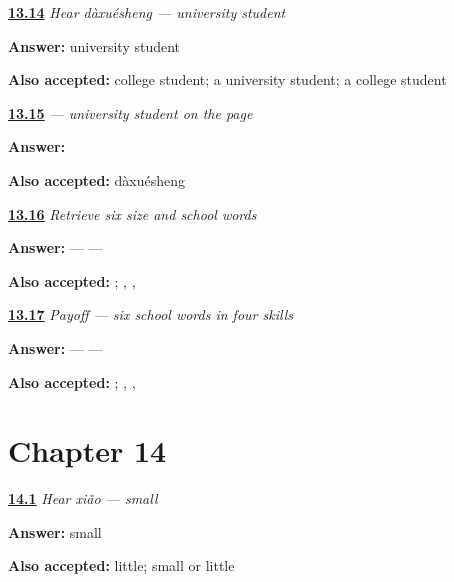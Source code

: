 \noindent\begin{minipage}[t]{\linewidth}
\raggedright
\hyperlink{review-ZH-C13-hear-daxuesheng-meaning}{\textbf{13.14}} \emph{Hear \emph{dàxuésheng} — university student}\par
\small \textbf{Answer:} university student\par
\footnotesize \textbf{Also accepted:} college student; a university student; a college student
\end{minipage}\par\medskip

\noindent\begin{minipage}[t]{\linewidth}
\raggedright
\hyperlink{review-ZH-C13-daxuesheng-write}{\textbf{13.15}} \emph{ — university student on the page}\par
\small \textbf{Answer:} \par
\footnotesize \textbf{Also accepted:}  dàxuésheng
\end{minipage}\par\medskip

\noindent\begin{minipage}[t]{\linewidth}
\raggedright
\hyperlink{review-ZH-R13-school-six-recall}{\textbf{13.16}} \emph{Retrieve six size and school words}\par
\small \textbf{Answer:}  —  — \par
\footnotesize \textbf{Also accepted:}   ; , , 
\end{minipage}\par\medskip

\noindent\begin{minipage}[t]{\linewidth}
\raggedright
\hyperlink{review-ZH-C13-practice-school-payoff}{\textbf{13.17}} \emph{Payoff — six school words in four skills}\par
\small \textbf{Answer:}  —  — \par
\footnotesize \textbf{Also accepted:}   ; , , 
\end{minipage}\par\medskip

\section*{Chapter 14}

\noindent\begin{minipage}[t]{\linewidth}
\raggedright
\hyperlink{review-ZH-C14-hear-xiao-meaning}{\textbf{14.1}} \emph{Hear \emph{xiǎo} — small}\par
\small \textbf{Answer:} small\par
\footnotesize \textbf{Also accepted:} little; small or little
\end{minipage}\par\medskip

